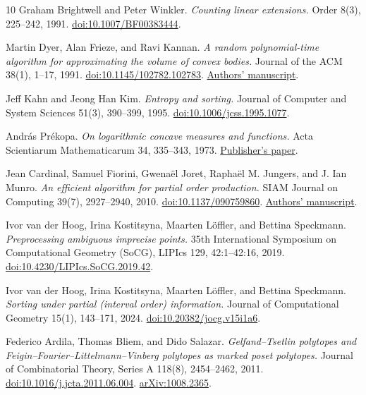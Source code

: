 \begin{thebibliography}{10}
Graham Brightwell and Peter Winkler.
\emph{Counting linear extensions.}
Order 8(3), 225--242, 1991.
\href{https://doi.org/10.1007/BF00383444}{doi:10.1007/BF00383444}.

Martin Dyer, Alan Frieze, and Ravi Kannan.
\emph{A random polynomial-time algorithm for approximating the volume of convex bodies.}
Journal of the ACM 38(1), 1--17, 1991.
\href{https://doi.org/10.1145/102782.102783}{doi:10.1145/102782.102783}.
\href{https://www.math.cmu.edu/~af1p/Texfiles/oldvolume.pdf}{Authors' manuscript}.

Jeff Kahn and Jeong Han Kim.
\emph{Entropy and sorting.}
Journal of Computer and System Sciences 51(3), 390--399, 1995.
\href{https://doi.org/10.1006/jcss.1995.1077}{doi:10.1006/jcss.1995.1077}.


Andr\'as Pr\'ekopa.
\emph{On logarithmic concave measures and functions.}
Acta Scientiarum Mathematicarum 34, 335--343, 1973.
\href{https://acta.bibl.u-szeged.hu/14411/1/math_034_335-343.pdf}{Publisher's paper}.

Jean Cardinal, Samuel Fiorini, Gwena\"el Joret, Rapha\"el M. Jungers,
and J. Ian Munro.
\emph{An efficient algorithm for partial order production.}
SIAM Journal on Computing 39(7), 2927--2940, 2010.
\href{https://doi.org/10.1137/090759860}{doi:10.1137/090759860}.
\href{https://arxiv.org/abs/0811.2572}{Authors' manuscript}.

Ivor van der Hoog, Irina Kostitsyna, Maarten L\"offler, and Bettina Speckmann.
\emph{Preprocessing ambiguous imprecise points.}
35th International Symposium on Computational Geometry (SoCG),
LIPIcs 129, 42:1--42:16, 2019.
\href{https://doi.org/10.4230/LIPIcs.SoCG.2019.42}{doi:10.4230/LIPIcs.SoCG.2019.42}.

Ivor van der Hoog, Irina Kostitsyna, Maarten L\"offler, and Bettina Speckmann.
\emph{Sorting under partial (interval order) information.}
Journal of Computational Geometry 15(1), 143--171, 2024.
\href{https://doi.org/10.20382/jocg.v15i1a6}{doi:10.20382/jocg.v15i1a6}.


Federico Ardila, Thomas Bliem, and Dido Salazar.
\emph{Gelfand--Tsetlin polytopes and Feigin--Fourier--Littelmann--Vinberg
polytopes as marked poset polytopes.}
Journal of Combinatorial Theory, Series A 118(8), 2454--2462, 2011.
\href{https://doi.org/10.1016/j.jcta.2011.06.004}{doi:10.1016/j.jcta.2011.06.004}.
\href{https://arxiv.org/abs/1008.2365}{arXiv:1008.2365}.


\end{thebibliography}
